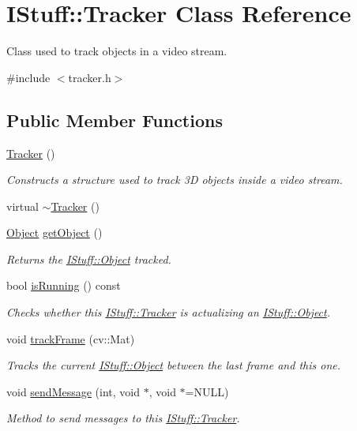 \hypertarget{class_i_stuff_1_1_tracker}{\section{I\-Stuff\-:\-:Tracker Class Reference}
\label{class_i_stuff_1_1_tracker}
}


Class used to track objects in a video stream.  




{\ttfamily \#include $<$tracker.\-h$>$}

\subsection*{Public Member Functions}
\begin{DoxyCompactItemize}
\item 
\hyperlink{class_i_stuff_1_1_tracker_adf214393a14e8bf23de2fc8231e239ec}{Tracker} ()
\begin{DoxyCompactList}\small\item\em Constructs a structure used to track 3\-D objects inside a video stream. \end{DoxyCompactList}\item 
virtual \hyperlink{class_i_stuff_1_1_tracker_a0ed1e23312cfe7fcfe5f2ac2abd69163}{$\sim$\-Tracker} ()
\item 
\hyperlink{class_i_stuff_1_1_object}{Object} \hyperlink{class_i_stuff_1_1_tracker_ab4419b0053b32baaa6e253aab5eef852}{get\-Object} ()
\begin{DoxyCompactList}\small\item\em Returns the \hyperlink{class_i_stuff_1_1_object}{I\-Stuff\-::\-Object} tracked. \end{DoxyCompactList}\item 
bool \hyperlink{class_i_stuff_1_1_tracker_adeaab8820045251bcf5a7b4f394eb568}{is\-Running} () const 
\begin{DoxyCompactList}\small\item\em Checks whether this \hyperlink{class_i_stuff_1_1_tracker}{I\-Stuff\-::\-Tracker} is actualizing an \hyperlink{class_i_stuff_1_1_object}{I\-Stuff\-::\-Object}. \end{DoxyCompactList}\item 
void \hyperlink{class_i_stuff_1_1_tracker_aec1abe2fb89fc417f1ef95794b6cccbc}{track\-Frame} (cv\-::\-Mat)
\begin{DoxyCompactList}\small\item\em Tracks the current \hyperlink{class_i_stuff_1_1_object}{I\-Stuff\-::\-Object} between the last frame and this one. \end{DoxyCompactList}\item 
void \hyperlink{class_i_stuff_1_1_tracker_a931b4e57f59d6a0f38d78bb34ab2332b}{send\-Message} (int, void $\ast$, void $\ast$=N\-U\-L\-L)
\begin{DoxyCompactList}\small\item\em Method to send messages to this \hyperlink{class_i_stuff_1_1_tracker}{I\-Stuff\-::\-Tracker}. \end{DoxyCompactList}\end{DoxyCompactItemize}
